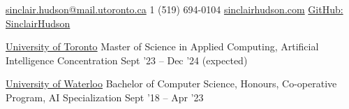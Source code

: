 \documentclass[10pt,a4paper]{article} %
\begin{document}
 



\noindent\href{mailto:sinclair.hudson@mail.utoronto.ca}{sinclair.hudson@mail.utoronto.ca}\bull %
\textsmaller{+}1 (519) 694-0104 \bull %
\href{http://www.sinclairhudson.com}{sinclairhudson.com} \bull
\href{https://github.com/SinclairHudson}{GitHub: SinclairHudson}

\spacedhrule{0.4em}{-0.4em} %

\headedsection %
{\href{https://www.utoronto.ca/}{University of Toronto}}
{\textsc{}} {
\headedsubsection %
{Master of Science in Applied Computing, Artificial Intelligence Concentration}
{Sept '23 -- Dec '24 (expected)}
{}
}

\headedsection %
{\href{https://uwaterloo.ca/}{University of Waterloo}}
{\textsc{}} {
\headedsubsection %
{Bachelor of Computer Science, Honours, Co-operative Program, AI Specialization}
{Sept '18 -- Apr '23}
{}
}
\end{document}
